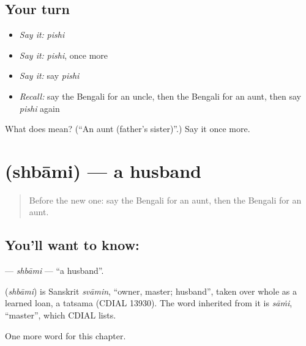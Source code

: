 \subsection*{Your turn}
\begin{itemize}
\raggedright
  \item \emph{Say it:} \emph{pishi}
  \item \emph{Say it:} \emph{pishi}, once more
  \item \emph{Say it:} say \emph{pishi}
  \item \emph{Recall:} say the Bengali for an uncle, then the Bengali for an aunt, then say \emph{pishi} again
\end{itemize}

\begin{tcolorbox}[breakable,colback=teal!4,colframe=teal!35!black,title={Before you move on}]
What does  mean? (\textquotedblleft{}An aunt (father's sister)\textquotedblright{}.) Say it once more.
\end{tcolorbox}
\section[\texorpdfstring{\bn{স্বামী} (shbāmi)}{স্বামী (shbāmi)}]{ (shbāmi) — a husband}

\label{lesson:BN-C47-shbami}



\begin{quote}
Before the new one: say the Bengali for an aunt, then the Bengali for an aunt.
\end{quote}

\subsection*{You'll want to know: }
\textbf{} — \emph{shbāmi} — \textquotedblleft{}a husband\textquotedblright{}.

\begin{cousinweb}
\textbf{} (\emph{shbāmi}) is Sanskrit \emph{svāmin}, \textquotedblleft{}owner, master; husband\textquotedblright{}, taken over whole as a learned loan, a tatsama (CDIAL 13930). The word inherited from it is \emph{sāṁi}, \textquotedblleft{}master\textquotedblright{}, which CDIAL lists.
\end{cousinweb}

\begin{grammarlens}[title={What you've built}]
One more word for this chapter.
\end{grammarlens}

